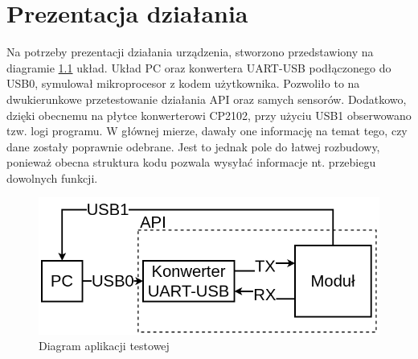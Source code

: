 \chapter{Prezentacja działania}
\label{cha:presentation}
Na potrzeby prezentacji działania urządzenia, stworzono przedstawiony na diagramie \ref{img:test_diagram} układ. Układ PC oraz konwertera UART-USB podłączonego do USB0, symulował mikroprocesor z kodem użytkownika. Pozwoliło to na dwukierunkowe przetestowanie działania API oraz samych sensorów. Dodatkowo, dzięki obecnemu na płytce konwerterowi CP2102, przy użyciu USB1 obserwowano tzw. logi programu. W głównej mierze, dawały one informację na temat tego, czy dane zostały poprawnie odebrane. Jest to jednak pole do łatwej rozbudowy, ponieważ obecna struktura kodu pozwala wysyłać informacje nt. przebiegu dowolnych funkcji.

\begin{figure}[H]
    \centering
    \includegraphics[width=\textwidth, height=\textheight, keepaspectratio]{Graphics/test_sch.png}
    \caption{Diagram aplikacji testowej}
    \label{img:test_diagram}
\end{figure}

